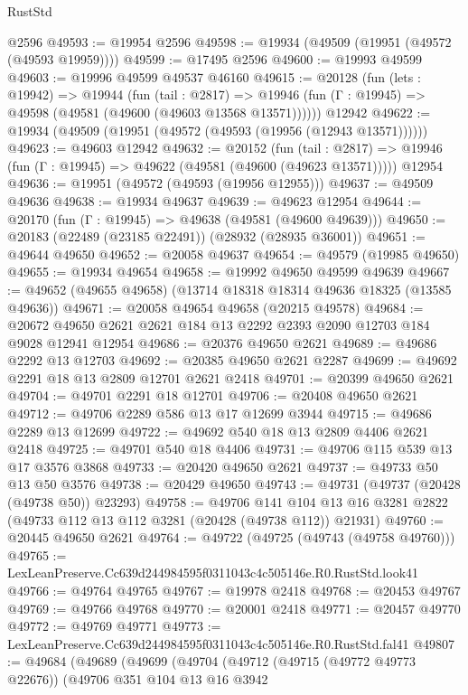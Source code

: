 \begin{lexlean}{RustStd}
\begin{coremodule}
    @2596
@49593 := @19954 @2596
@49598 := @19934 (@49509 (@19951 (@49572 (@49593 @19959))))
@49599 := @17495 @2596
@49600 := @19993 @49599
@49603 := @19996 @49599 @49537 @46160
@49615 := @20128
    (fun (lets : @19942) =>
    @19944
      (fun (tail : @2817) =>
      @19946 (fun (Γ : @19945) => @49598 (@49581 (@49600 (@49603 @13568 @13571))))))
    @12942
@49622 := @19934 (@49509 (@19951 (@49572 (@49593 (@19956 (@12943 @13571))))))
@49623 := @49603 @12942
@49632 := @20152
    (fun (tail : @2817) => @19946 (fun (Γ : @19945) => @49622 (@49581 (@49600 (@49623 @13571)))))
    @12954
@49636 := @19951 (@49572 (@49593 (@19956 @12955)))
@49637 := @49509 @49636
@49638 := @19934 @49637
@49639 := @49623 @12954
@49644 := @20170 (fun (Γ : @19945) => @49638 (@49581 (@49600 @49639)))
@49650 := @20183 (@22489 (@23185 @22491)) (@28932 (@28935 @36001))
@49651 := @49644 @49650
@49652 := @20058 @49637
@49654 := @49579 (@19985 @49650)
@49655 := @19934 @49654
@49658 := @19992 @49650 @49599 @49639
@49667 := @49652 (@49655 @49658) (@13714 @18318 @18314 @49636 @18325 (@13585 @49636))
@49671 := @20058 @49654 @49658 (@20215 @49578)
@49684 := @20672 @49650 @2621 @2621 @184 @13 @2292 @2393 @2090 @12703 @184 @9028 @12941 @12954
@49686 := @20376 @49650 @2621
@49689 := @49686 @2292 @13 @12703
@49692 := @20385 @49650 @2621 @2287
@49699 := @49692 @2291 @18 @13 @2809 @12701 @2621 @2418
@49701 := @20399 @49650 @2621
@49704 := @49701 @2291 @18 @12701
@49706 := @20408 @49650 @2621
@49712 := @49706 @2289 @586 @13 @17 @12699 @3944
@49715 := @49686 @2289 @13 @12699
@49722 := @49692 @540 @18 @13 @2809 @4406 @2621 @2418
@49725 := @49701 @540 @18 @4406
@49731 := @49706 @115 @539 @13 @17 @3576 @3868
@49733 := @20420 @49650 @2621
@49737 := @49733 @50 @13 @50 @3576
@49738 := @20429 @49650
@49743 := @49731 (@49737 (@20428 (@49738 @50)) @23293)
@49758 := @49706
    @141
    @104
    @13
    @16
    @3281
    @2822
    (@49733 @112 @13 @112 @3281 (@20428 (@49738 @112)) @21931)
@49760 := @20445 @49650 @2621
@49764 := @49722 (@49725 (@49743 (@49758 @49760)))
@49765 := LexLeanPreserve.Cc639d244984595f0311043c4c505146e.R0.RustStd.look41
@49766 := @49764 @49765
@49767 := @19978 @2418
@49768 := @20453 @49767
@49769 := @49766 @49768
@49770 := @20001 @2418
@49771 := @20457 @49770
@49772 := @49769 @49771
@49773 := LexLeanPreserve.Cc639d244984595f0311043c4c505146e.R0.RustStd.fal41
@49807 := @49684
    (@49689
      (@49699
        (@49704
          (@49712
            (@49715 (@49772 @49773 @22676))
            (@49706
              @351
              @104
              @13
              @16
              @3942

\end{coremodule}
\end{lexlean}
